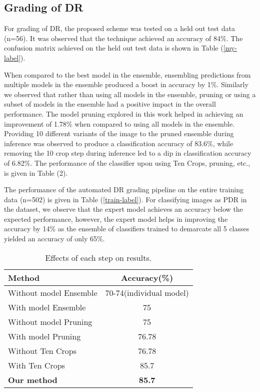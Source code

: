 \documentclass{paper}
\begin{document}
\subsection{Grading of DR}
For grading of DR, the proposed scheme was tested on a held out test data (n=56). It was observed that the technique achieved an accuracy of 84\%.  The confusion matrix achieved on the held out test data is shown in Table (\ref{my-label}).
\par When compared to the best model in the ensemble, ensembling predictions from multiple models in the ensemble produced a boost in accuracy by 1\%. Similarly we observed that rather than using all models in the ensemble, pruning or using a subset of models in the ensemble had a positive impact in the overall performance. The model pruning explored in this work helped in achieving an improvement of  1.78\% when compared to using all models in the ensemble. Providing 10 different variants of the image to the pruned ensemble during inference  was observed to produce a classification accuracy of  83.6\%, while removing the 10 crop step during inference led to a dip in classification accuracy of 6.82\%. The performance of the classifier upon using Ten Crops, pruning, etc., is given in Table (2).

\par The performance of the automated DR grading pipeline on the entire training data (n=502) is given in Table (\ref{train-label}). For classifying images as PDR in the dataset, we observe that the expert model achieves an accuracy below the expected performance, however, the expert model helps in improving the accuracy by  14\% as the ensemble of classifiers trained to demarcate all 5 classes yielded an accuracy of only 65\%. 

\begin{table}[h!]
\label{effect1}
  \begin{center}
    \caption{Effects of each step on results.}
    \begin{tabular}{|l|c|} 
    \hline
      \textbf{Method}&\textbf{Accuracy(\%)}\\
       \hline
      Without model Ensemble   & 70-74(individual model) \\
      With model Ensemble & 75\\
      \hline
      Without model Pruning  & 75 \\
      With model Pruning & 76.78\\
      \hline
      Without Ten Crops & 76.78\\
      With Ten Crops & 85.7\\
      \hline
      \textbf{Our method} &\textbf{85.7}\\
      \hline
    \end{tabular}
  \end{center}
  \label{effect}
\end{table}
\end{document}
